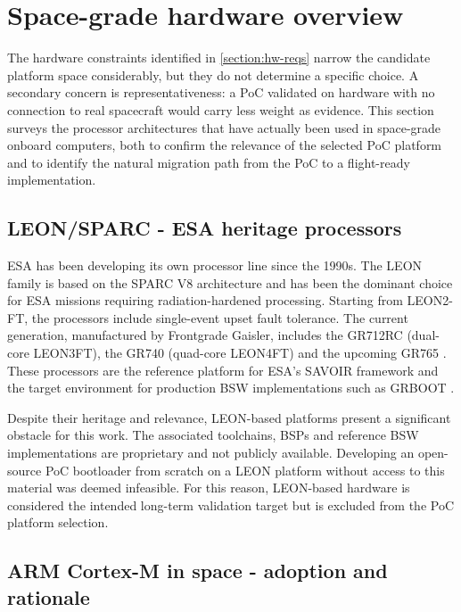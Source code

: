 \section{Space-grade hardware overview}
\label{section:hw-spacegrade}

The hardware constraints identified in \autoref{section:hw-reqs} narrow the candidate platform space considerably, but they do not determine a specific choice. A secondary concern is representativeness: a PoC validated on hardware with no connection to real spacecraft would carry less weight as evidence. This section surveys the processor architectures that have actually been used in space-grade onboard computers, both to confirm the relevance of the selected PoC platform and to identify the natural migration path from the PoC to a flight-ready implementation.

\subsection{LEON/SPARC - ESA heritage processors}
\label{subsection:hw-spacegrade-leon}

ESA has been developing its own processor line since the 1990s. The LEON family is based on the SPARC V8 architecture and has been the dominant choice for ESA missions requiring radiation-hardened processing. Starting from LEON2-FT, the processors include single-event upset fault tolerance. The current generation, manufactured by Frontgrade Gaisler, includes the GR712RC (dual-core LEON3FT), the GR740 (quad-core LEON4FT) and the upcoming GR765 \cite{frontgrade_leon_processors}. These processors are the reference platform for ESA's SAVOIR framework and the target environment for production BSW implementations such as GRBOOT \cite{GRBOOT}.

Despite their heritage and relevance, LEON-based platforms present a significant obstacle for this work. The associated toolchains, BSPs and reference BSW implementations are proprietary and not publicly available. Developing an open-source PoC bootloader from scratch on a LEON platform without access to this material was deemed infeasible. For this reason, LEON-based hardware is considered the intended long-term validation target but is excluded from the PoC platform selection.

\subsection{ARM Cortex-M in space - adoption and rationale}
\label{subsection:hw-spacegrade-armM}

